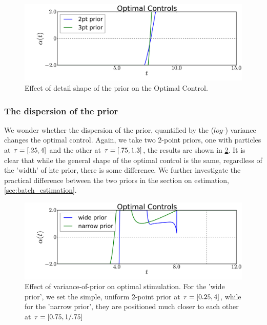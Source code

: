 \documentclass{article}
\begin{document}
\begin{figure}[htp]
\begin{center}
  \includegraphics[width=1\textwidth]{Figs/AdjointOptimizer/NumberOfTausEffect.pdf}
  \caption[Detail-Shape-of-Prior Impact]{Effect of detail shape of the prior on
  the Optimal Control.} 
  \label{fig:prior_shape_impact} 
\end{center}
\end{figure}

\subsubsection{The dispersion of the prior}
We wonder whether the dispersion of the prior, quantified by the ($log$-)
variance changes the optimal control. Again, we take two 2-point priors, one with
particles at ${ \tau } = [.25, 4]$ and the other at ${ \tau } = [.75,1.3]$, the results
are shown in \cref{fig:prior_dispersion_impact}. It is clear that while the
general shape of the optimal control is the same, regardless of the 'width' of
hte prior, there is some difference. We further investigate the
practical difference between the two priors in the section on estimation,
\cref{sec:batch_estimation}.

\begin{figure}[htp]
\begin{center}
  \includegraphics[width=\textwidth]{Figs/AdjointOptimizer/PriorSpread.pdf}
  \caption[Variance-of-Prior Effect]{Effect of variance-of-prior on
  optimal stimulation. For the 'wide prior', we set the simple, uniform 2-point prior at
   ${ \tau } =  [0.25, 4]$, while for the 'narrow prior', they are positioned much
   closer to each other at ${ \tau } =   [0.75, 1/.75 ]$  }
  \label{fig:prior_dispersion_impact} 
\end{center}
\end{figure}
\end{document}
